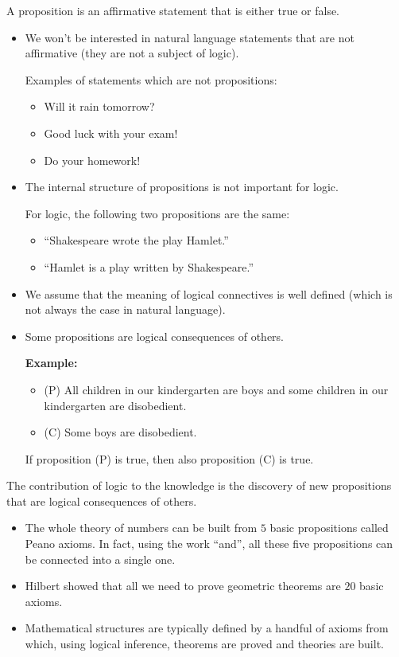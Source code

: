 \documentclass[11pt,paper=b5,footinclude,headinclude]{scrbook} %
\theoremstyle{remark}
\theoremstyle{definition} %
\theoremstyle{theorem} %
\begin{document}
A proposition is an affirmative statement that is either true or false.
\begin{itemize}
  \item We won't be interested in natural language statements that are not affirmative (they are not a subject of logic).

  Examples of statements which are not propositions: 
  \begin{itemize}
      \item Will it rain tomorrow? 
      \item Good luck with your exam! 
      \item Do your homework!
  \end{itemize}
  \item The internal structure of propositions is not important for logic.

  For logic, the following two propositions are the same:
  \begin{itemize}
    \item ``Shakespeare wrote the play Hamlet.''

    \item ``Hamlet is a play written by Shakespeare.''
  \end{itemize}
  \item We assume that the meaning of logical connectives is well defined (which is not always the case in natural language).
  \item 
  Some propositions are logical consequences of others.
  
\textbf{Example:}
\begin{itemize}
  \item (P) All children in our kindergarten are boys and some children in our kindergarten are disobedient.
  \item (C) Some boys are disobedient.
\end{itemize}
If proposition (P) is true, then also proposition (C) is true.
\end{itemize}

The contribution of logic to the knowledge is the discovery of new propositions that are logical consequences of others.
\begin{itemize}
  \item The whole theory of numbers can be built from $5$ basic propositions called Peano axioms. In fact, using the work ``and'', all these five propositions can be connected into a single one.
  \item Hilbert showed that all we need to prove geometric theorems are $20$ basic axioms.
  \item Mathematical structures are typically defined by a handful of axioms from which, using logical inference, theorems are proved and theories are built.
\end{itemize}
\end{document}

